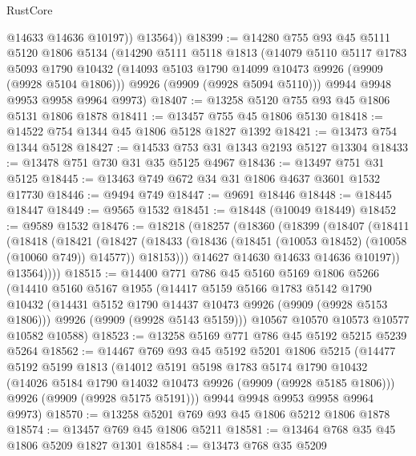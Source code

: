 \begin{lexlean}{RustCore}
\begin{coremodule}
            @14633
            @14636
            @10197))
        @13564))
@18399 := @14280
    @755
    @93
    @45
    @5111
    @5120
    @1806
    @5134
    (@14290
      @5111
      @5118
      @1813
      (@14079
        @5110
        @5117
        @1783
        @5093
        @1790
        @10432
        (@14093 @5103 @1790 @14099 @10473 @9926 (@9909 (@9928 @5104 @1806)))
        @9926
        (@9909 (@9928 @5094 @5110)))
      @9944
      @9948
      @9953
      @9958
      @9964
      @9973)
@18407 := @13258 @5120 @755 @93 @45 @1806 @5131 @1806 @1878
@18411 := @13457 @755 @45 @1806 @5130
@18418 := @14522 @754 @1344 @45 @1806 @5128 @1827 @1392
@18421 := @13473 @754 @1344 @5128
@18427 := @14533 @753 @31 @1343 @2193 @5127 @13304
@18433 := @13478 @751 @730 @31 @35 @5125 @4967
@18436 := @13497 @751 @31 @5125
@18445 := @13463 @749 @672 @34 @31 @1806 @4637 @3601 @1532 @17730
@18446 := @9494 @749
@18447 := @9691 @18446
@18448 := @18445 @18447
@18449 := @9565 @1532
@18451 := @18448 (@10049 @18449)
@18452 := @9589 @1532
@18476 := @18218
    (@18257
      (@18360
        (@18399
          (@18407
            (@18411
              (@18418
                (@18421
                  (@18427
                    (@18433
                      (@18436 (@18451 (@10053 @18452) (@10058 (@10060 @749)) @14577))
                      @18153)))
                @14627
                @14630
                @14633
                @14636
                @10197))
            @13564))))
@18515 := @14400
    @771
    @786
    @45
    @5160
    @5169
    @1806
    @5266
    (@14410
      @5160
      @5167
      @1955
      (@14417
        @5159
        @5166
        @1783
        @5142
        @1790
        @10432
        (@14431 @5152 @1790 @14437 @10473 @9926 (@9909 (@9928 @5153 @1806)))
        @9926
        (@9909 (@9928 @5143 @5159)))
      @10567
      @10570
      @10573
      @10577
      @10582
      @10588)
@18523 := @13258 @5169 @771 @786 @45 @5192 @5215 @5239 @5264
@18562 := @14467
    @769
    @93
    @45
    @5192
    @5201
    @1806
    @5215
    (@14477
      @5192
      @5199
      @1813
      (@14012
        @5191
        @5198
        @1783
        @5174
        @1790
        @10432
        (@14026 @5184 @1790 @14032 @10473 @9926 (@9909 (@9928 @5185 @1806)))
        @9926
        (@9909 (@9928 @5175 @5191)))
      @9944
      @9948
      @9953
      @9958
      @9964
      @9973)
@18570 := @13258 @5201 @769 @93 @45 @1806 @5212 @1806 @1878
@18574 := @13457 @769 @45 @1806 @5211
@18581 := @13464 @768 @35 @45 @1806 @5209 @1827 @1301
@18584 := @13473 @768 @35 @5209

\end{coremodule}
\end{lexlean}
